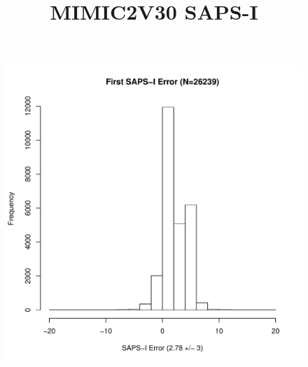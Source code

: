 \documentclass[10pt]{article}
\begin{document}
\title{MIMIC2V30 SAPS-I}
\maketitle


\begin{figure}
\includegraphics[width=0.45\linewidth]{../../figure/fig_hist_sapsi_first_err.pdf}
\end{figure}
\end{document}
